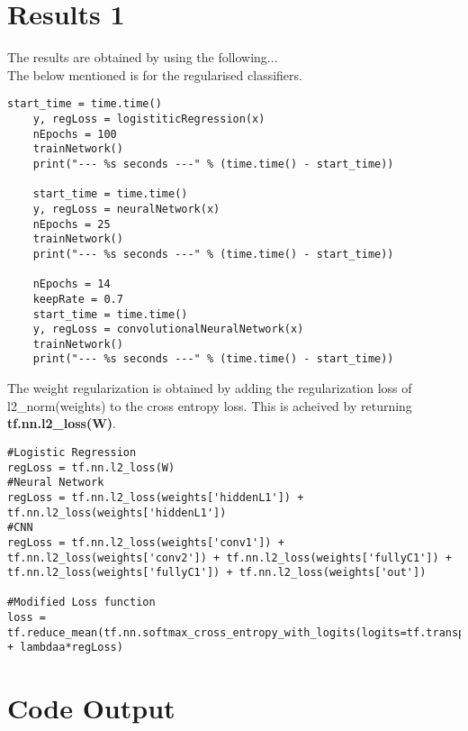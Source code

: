 \documentclass[a4paper,11pt]{article}
\begin{document}
\section*{Results 1}
The results are obtained by using the following...\\
The below mentioned is for the regularised classifiers.
\begin{lstlisting}[label={list:fourth}]
	start_time = time.time()
	y, regLoss = logistiticRegression(x)
	nEpochs = 100
	trainNetwork()
	print("--- %s seconds ---" % (time.time() - start_time))
	
	start_time = time.time()
	y, regLoss = neuralNetwork(x)
	nEpochs = 25
	trainNetwork()
	print("--- %s seconds ---" % (time.time() - start_time))
	
	nEpochs = 14
	keepRate = 0.7
	start_time = time.time()
	y, regLoss = convolutionalNeuralNetwork(x)
	trainNetwork()
	print("--- %s seconds ---" % (time.time() - start_time))
\end{lstlisting}

The weight regularization is obtained by adding the regularization loss of l2\_norm(weights) to the cross entropy loss. This is acheived by returning \textbf{tf.nn.l2\_loss(W)}.

\begin{lstlisting}[label={list:fourth}]
#Logistic Regression
regLoss = tf.nn.l2_loss(W)
#Neural Network
regLoss = tf.nn.l2_loss(weights['hiddenL1']) + tf.nn.l2_loss(weights['hiddenL1'])
#CNN
regLoss = tf.nn.l2_loss(weights['conv1']) + tf.nn.l2_loss(weights['conv2']) + tf.nn.l2_loss(weights['fullyC1']) + tf.nn.l2_loss(weights['fullyC1']) + tf.nn.l2_loss(weights['out'])

#Modified Loss function
loss = tf.reduce_mean(tf.nn.softmax_cross_entropy_with_logits(logits=tf.transpose(y),labels=tf.transpose(t)) + lambdaa*regLoss)
\end{lstlisting}

\section*{Code Output}
\end{document}
